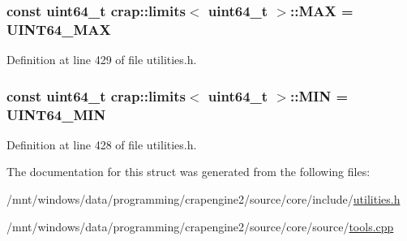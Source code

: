 \subsubsection[{M\+A\+X}]{\setlength{\rightskip}{0pt plus 5cm}const uint64\+\_\+t {\bf crap\+::limits}$<$ uint64\+\_\+t $>$\+::M\+A\+X = {\bf U\+I\+N\+T64\+\_\+\+M\+A\+X}\hspace{0.3cm}{\ttfamily [static]}}\label{structcrap_1_1limits_3_01uint64__t_01_4_a7a37d0e7978b1adc854aad337e523a7b}


Definition at line 429 of file utilities.\+h.

\hypertarget{structcrap_1_1limits_3_01uint64__t_01_4_aad4a8fa4a712d5bc65a09835422df073}{}
\subsubsection[{M\+I\+N}]{\setlength{\rightskip}{0pt plus 5cm}const uint64\+\_\+t {\bf crap\+::limits}$<$ uint64\+\_\+t $>$\+::M\+I\+N = {\bf U\+I\+N\+T64\+\_\+\+M\+I\+N}\hspace{0.3cm}{\ttfamily [static]}}\label{structcrap_1_1limits_3_01uint64__t_01_4_aad4a8fa4a712d5bc65a09835422df073}


Definition at line 428 of file utilities.\+h.



The documentation for this struct was generated from the following files\+:\begin{DoxyCompactItemize}
\item 
/mnt/windows/data/programming/crapengine2/source/core/include/\hyperlink{utilities_8h}{utilities.\+h}\item 
/mnt/windows/data/programming/crapengine2/source/core/source/\hyperlink{tools_8cpp}{tools.\+cpp}\end{DoxyCompactItemize}

